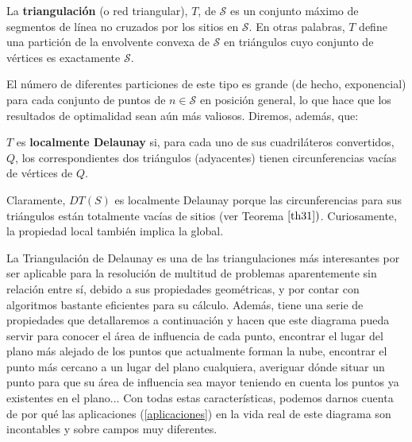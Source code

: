 \begin{definicion} La \textbf{triangulación} (o red triangular), $T$, de $\mathcal{S}$ es un conjunto máximo de segmentos de línea no cruzados por los sitios en $\mathcal{S}$. En otras palabras, $T$ define una partición de la envolvente convexa de $\mathcal{S}$ en triángulos cuyo conjunto de vértices es exactamente $\mathcal{S}$. \end{definicion} 


El número de diferentes particiones de este tipo es grande (de hecho, exponencial) para cada conjunto de puntos de $n \in \mathcal{S}$ en posición general, lo que hace que los resultados de optimalidad sean aún más valiosos.
Diremos, además, que: \begin{definicion} $T$ es \textbf{localmente Delaunay} si, para cada uno de sus cuadriláteros convertidos, $Q$, los correspondientes dos triángulos (adyacentes) tienen circunferencias vacías de vértices de $Q$. \end{definicion}
Claramente, $DT(S)$ es localmente Delaunay porque las circunferencias para sus triángulos están totalmente vacías de sitios (ver Teorema $\ref{th31})$. Curiosamente, la propiedad local también implica la global.

La Triangulación de Delaunay es una de las triangulaciones más interesantes por ser aplicable para la resolución de multitud de problemas aparentemente sin relación entre sí, debido a sus propiedades geométricas, y por contar con algoritmos bastante eficientes para su cálculo. Además, tiene una serie de propiedades que detallaremos a continuación y hacen que este diagrama pueda servir para conocer el área de influencia de cada punto, encontrar el lugar del plano más alejado de los puntos que actualmente forman la nube, encontrar el punto más cercano a un lugar del plano cualquiera, averiguar dónde situar un punto para que su área de influencia sea mayor teniendo en cuenta los puntos ya existentes en el plano... Con todas estas características, podemos darnos cuenta de por qué las aplicaciones (\ref{aplicaciones}) en la vida real de este diagrama son incontables y sobre campos muy diferentes.\vspace{0.3cm}

